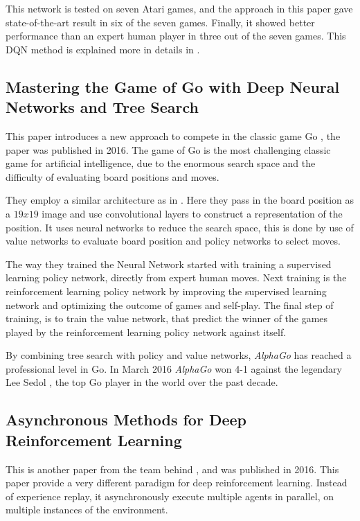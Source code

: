 This network is tested on seven Atari games, and the approach in this paper gave state-of-the-art result in six of the seven games. Finally, it showed better performance than an expert human player in three out of the seven games.  This DQN method is explained more in details in .  

\subsection{Mastering the Game of Go with Deep Neural Networks and Tree Search}\cite{Silver_2016}
This paper introduces a new approach to compete in the classic game Go \cite{explain_go}, the paper was published in 2016. The game of Go is the most challenging classic game for artificial intelligence, due to the enormous search space and the difficulty of evaluating board positions and moves. 

They employ a similar architecture as in \cite{DBLP:journals/corr/MnihKSGAWR13}. Here they pass in the board position as a $19 x 19$ image and use convolutional layers to construct a representation of the position. It uses neural networks to reduce the search space, this is done by use of value networks to evaluate board position and policy networks to select moves.

The way they trained the Neural Network started with training a supervised learning policy network, directly from expert human moves. Next training is the reinforcement learning policy network by improving the supervised learning network and optimizing the outcome of games and self-play. The final step of training, is to train the value network, that predict the winner of the games played by the reinforcement learning policy network against itself.   

By combining tree search with policy and value networks, \textit{AlphaGo} has reached a professional level in Go. In March 2016 \textit{AlphaGo} won 4-1 against the legendary Lee Sedol , the top Go player in the world over the past decade.  

\subsection{Asynchronous Methods for Deep Reinforcement Learning}\label{AsyncMeths}\cite{DBLP:journals/corr/MnihBMGLHSK16}
This is another paper from the team behind \cite{DBLP:journals/corr/MnihKSGAWR13}, and was published in 2016. This paper provide a very different paradigm for deep reinforcement learning. Instead of experience replay, it asynchronously execute multiple agents in parallel, on multiple instances of the environment. 

